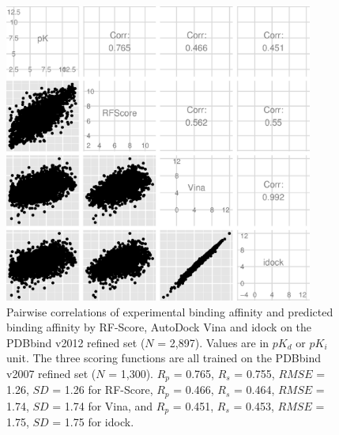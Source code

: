 \begin{figure}[!ht]
\begin{center}
\includegraphics[width=4in]{../istar/PDBbind2012Correlations.eps}
\end{center}
\caption{Pairwise correlations of experimental binding affinity and predicted binding affinity by RF-Score, AutoDock Vina and idock on the PDBbind v2012 refined set ($N$ = 2,897). Values are in $pK_d$ or $pK_i$ unit. The three scoring functions are all trained on the PDBbind v2007 refined set ($N$ = 1,300). $R_p$ = 0.765, $R_s$ = 0.755, $RMSE$ = 1.26, $SD$ = 1.26 for RF-Score, $R_p$ = 0.466, $R_s$ = 0.464, $RMSE$ = 1.74, $SD$ = 1.74 for Vina, and $R_p$ = 0.451, $R_s$ = 0.453, $RMSE$ = 1.75, $SD$ = 1.75 for idock.}
\label{PDBbind2012Correlations}
\end{figure}

